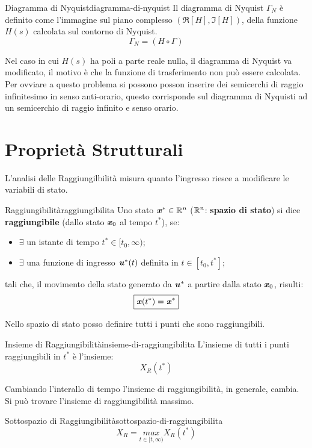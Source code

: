 \documentclass[12pt]{article}
\begin{document}
\begin{definition}{Diagramma di Nyquist}{diagramma-di-nyquist}
    Il diagramma di Nyquist $\Gamma_N$ \`e definito come l'immagine sul piano complesso $(\Re[H], \Im[H])$, della funzione $H(s)$ calcolata sul contorno di Nyquist.
    \[ \Gamma_N = (H \circ \Gamma) \]
\end{definition}

Nel caso in cui $H(s)$ ha poli a parte reale nulla, il diagramma di Nyquist va modificato, il motivo \`e che la funzione di trasferimento non pu\`o essere calcolata. Per ovviare a questo problema si possono posson inserire dei semicerchi di raggio infinitesimo in senso anti-orario, questo corrisponde sul diagramma di Nyquisti ad un semicerchio di raggio infinito e senso orario.




\section{Propriet\`a Strutturali}
L'analisi delle Raggiungilbilit\`a misura quanto l'ingresso riesce a modificare le variabili di stato.

\begin{definition}{Raggiungibilit\`a}{raggiungibilita}
    Uno stato $\textbf{\textit{x}}^{*} \in \mathbb{R}^{n}$ ($\mathbb{R}^{n}$: \textbf{spazio di stato}) si dice \textbf{raggiungibile} (dallo stato $\textbf{\textit{x}}_0$ al tempo $t^{*}$), se:
    \begin{itemize}
        \item $\exists$ un istante di tempo $t^{*} \in [t_0, \infty)$;
        \item $\exists$ una funzione di ingresso $\textbf{\textit{u}}^{*}(t)$ definita in $t \in [t_0, t^{*}]$;
    \end{itemize}
    tali che, il movimento della stato generato da $\textbf{\textit{u}}^{*}$ a partire dalla stato $\textbf{\textit{x}}_0$, risulti:
    \[ \boxed{\textbf{\textit{x}}(t^{*}) = \textbf{\textit{x}}^{*}} \]
\end{definition}

Nello spazio di stato posso definire tutti i punti che sono raggiungibili.
\begin{definition}{Insieme di Raggiungibilit\`a}{insieme-di-raggiungibilita}
    L'insieme di tutti i punti raggiungibili in $t^{*}$ \`e l'insieme:
    \[ X_R(t^{*}) \]
\end{definition}

Cambiando l'interallo di tempo l'insieme di raggiungibilit\`a, in generale, cambia. Si pu\`o trovare l'insieme di raggiungibilit\`a massimo.
\begin{definition}{Sottospazio di Raggiungibilit\`a}{sottospazio-di-raggiungibilita}
    \[ X_R = \underset{t\in[t,\infty)}{max} X_R(t^{*}) \]
\end{definition}
\end{document}
